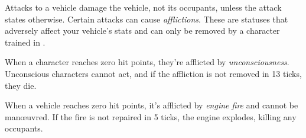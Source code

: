 
Attacks to a vehicle damage the vehicle, not its occupants, unless the attack states otherwise. Certain attacks can cause \emph{afflictions}. These are statuses that adversely affect your vehicle's stats and can only be removed by a character trained in .

When a character reaches zero hit points, they're afflicted by \emph{unconsciousness}. Unconscious characters cannot act, and if the affliction is not removed in 13 ticks, they die.

When a vehicle reaches zero hit points, it's afflicted by \emph{engine fire} and cannot be man\oe{}uvred. If the fire is not repaired in 5 ticks, the engine explodes, killing any occupants.
